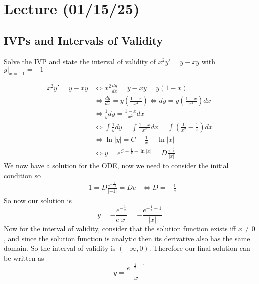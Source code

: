 \documentclass[notes.tex]{subfiles}
\begin{document}
\setcounter{section}{2}
\section{Lecture (01/15/25)}

\subsection{IVPs and Intervals of Validity}
\begin{exercise}
    Solve the IVP and state the interval of validity of $x^2 y' = y - xy$ with $y|_{x = -1} = -1$
\end{exercise}
\begin{solution}
    \begin{align*}
        x^2 y' = y - xy
        &\iff x^2\frac{dy}{dx} = y - xy = y(1 - x) \\
        &\iff \frac{dy}{dx} = y\left(\frac{1 - x}{x^2}\right)
        \iff dy = y\left(\frac{1 - x}{x^2}\right)dx \\
        &\iff \frac{1}{y}dy = \frac{1 - x}{x^2}dx \\
        &\iff \int \frac{1}{y}dy = \int \frac{1 - x}{x^2}dx = \int \left(\frac{1}{x^2} - \frac{1}{x}\right)dx \\
        &\iff \ln|y| = C - \frac{1}{x} - \ln|x| \\
        &\iff y = e^{C - \frac{1}{x} - \ln|x|} = D\frac{e^{-\frac{1}{x}}}{|x|}
    \end{align*}
    We now have a solution for the ODE, now we need to consider the initial condition so
    \begin{align*}
        -1 = D\frac{e^{-\frac{1}{-1}}}{|-1|} = De &\iff D = -\frac{1}{e}
    \end{align*}
    So now our solution is
    \begin{equation} \label{test_answer_1}
        y = -\frac{e^{-\frac{1}{x}}}{e|x|} = -\frac{e^{-\frac{1}{x} - 1}}{|x|}
    \end{equation}
    Now for the interval of validity, consider that the solution function exists iff $x \neq 0$, and since the solution function is analytic then its derivative also has the same domain. So the interval of validity is $(-\infty, 0)$. Therefore our final solution can be written as
    \begin{equation} \label{test_answer_2}
        y = \frac{e^{-\frac{1}{x} - 1}}{x}
    \end{equation}
\end{solution}
\end{document}
